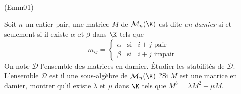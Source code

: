 \begin{tiny}(Emm01)\end{tiny}
Soit $n$ un entier pair, une matrice $M$ de $\mathcal{M}_{n}(\K)$ est dite \emph{en damier} si et seulement si il existe $\alpha $ et $\beta $ dans $\K$ tels que
\[
m_{ij}=\left\{
\begin{array}{ccc}
\alpha  & \text{si} & i+j\text{ pair} \\
\beta  & \text{si} & i+j\text{ impair}
\end{array}
\right.
\]
On note $\mathcal{D}$ l'ensemble des matrices en damier. {\'E}tudier les stabilit{\'e}s de $\mathcal{D}$. L'ensemble $\mathcal{D}$ est il une sous-alg{\`e}bre de $\mathcal{M}_{n}(\K)$ ?\newline Si $M$ est une matrice en damier, montrer qu'il existe $\lambda $ et $\mu$ dans $\K$ tels que $M^{3}=\lambda M^{2}+\mu M$.
